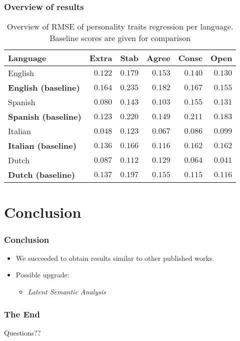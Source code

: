\documentclass[utf8]{beamer}
\begin{document}
\begin{frame}
		\frametitle{Overview of results}
	\begin{table}
		\caption{Overview of RMSE of personality traits regression per language. Baseline scores are given for comparison}
		\label{tab:scores-personality}
		\begin{center}
			\begin{tabular}{l|rrrrr}
				\toprule
				Language & Extra & Stab & Agree & Consc & Open \\
				\midrule
				English & $ 0.122 $ & $ 0.179 $ & $ 0.153 $ & $ 0.140 $ & $ 0.130 $ \\
				\textbf{English (baseline)} & $ 0.164 $ & $ 0.235 $ & $ 0.182 $ & $ 0.167 $ & $ 0.155 $ \\
				Spanish & $ 0.080 $ & $ 0.143 $ & $ 0.103 $ & $ 0.155 $ & $ 0.131 $ \\
				\textbf{Spanish (baseline)} & $ 0.123 $ & $ 0.220 $ & $ 0.149 $ & $ 0.211 $ & $ 0.183 $ \\
				Italian & $ 0.048 $ & $ 0.123 $ & $ 0.067 $ & $ 0.086 $ & $ 0.099 $ \\
				\textbf{Italian (baseline)} & $ 0.136 $ & $ 0.166 $ & $ 0.116 $ & $ 0.162 $ & $ 0.162 $ \\
				Dutch & $ 0.087 $ & $ 0.112 $ & $ 0.129 $ & $ 0.064 $ & $ 0.041 $ \\
				\textbf{Dutch (baseline)} & $ 0.137 $ & $ 0.197 $ & $ 0.155 $ & $ 0.115 $ & $ 0.116 $ \\
				\bottomrule
			\end{tabular}
		\end{center}
	\end{table}
\end{frame}
\section{Conclusion}


\begin{frame}
	\frametitle{Conclusion}
	\begin{itemize}
		\item We succeeded to obtain results similar to other published works.\\
		\vspace{20px}
		\item Possible upgrade:
		\begin{itemize}
			\item \textit{Latent Semantic Analysis}
		\end{itemize}
	\end{itemize}
\end{frame}


\begin{frame}
		\frametitle{The End}
	\Huge{\centerline{Questions??}}
\end{frame}

\end{document}
